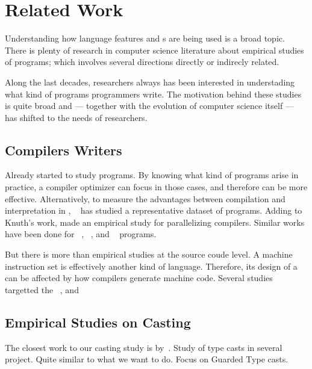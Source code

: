 
\chapter{Related Work}

Understanding how language features and \api{}s are being used is a broad topic.
There is plenty of research in computer science literature about empirical studies of programs;
which involves several directions directly or indirecly related.

Along the last decades, researchers always has been interested in understading what kind of programs programmers write.
The motivation behind these studies is quite broad and --- together with the evolution of computer science itself --- has shifted to the needs of researchers.

\section{Compilers Writers}

Already \cite{knuth_empirical_1971} started to study \fortran{} programs.
By knowing what kind of programs arise in practice, a compiler optimizer can focus in those cases, and therefore can be more effective.
Alternatively, to measure the advantages between compilation and interpretation in \basic{}, ~\cite{hammond_basic_1977} has studied a representative dataset of programs.
Adding to Knuth's work, \cite{shen_empirical_1990} made an empirical study for parallelizing compilers.
Similar works have been done for \cobol{}~\cite{salvadori_static_1975,chevance_static_1978}, \pascal{}~\cite{cook_contextual_1982}, and \apl{}~\cite{saal_properties_1975,saal_empirical_1977} programs.

But there is more than empirical studies at the source coude level.
A machine instruction set is effectively another kind of language.
Therefore, its design of a can be affected by how compilers generate machine code.
Several studies targetted the \jvm{}~\cite{collberg_empirical_2007,odonoghue_bigram_2002,antonioli_analysis_1998}, and \lilith{}~\cite{cook_empirical_1989}

\section{Empirical Studies on Casting}

The closest work to our casting study is by~\cite{winther_guarded_2011}.
Study of type casts in several project.
Quite similar to what we want to do.
Focus on Guarded Type casts.


